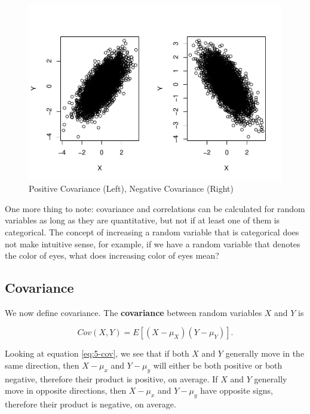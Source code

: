 \documentclass[
]{book}
\begin{document}
\begin{figure}
\centering
\includegraphics{bookdown-demo_files/figure-latex/5-covs-1.pdf}
\caption{\label{fig:5-covs}Positive Covariance (Left), Negative Covariance (Right)}
\end{figure}

One more thing to note: covariance and correlations can be calculated for random variables as long as they are quantitative, but not if at least one of them is categorical. The concept of increasing a random variable that is categorical does not make intuitive sense, for example, if we have a random variable that denotes the color of eyes, what does increasing color of eyes mean?

\hypertarget{covariance}{%
\subsection{Covariance}\label{covariance}}

We now define covariance. The \textbf{covariance} between random variables \(X\) and \(Y\) is

\begin{equation} 
Cov(X,Y) = E\left[(X- \mu_X)(Y - \mu_Y) \right].
\label{eq:5-cov}
\end{equation}

Looking at equation \eqref{eq:5-cov}, we see that if both \(X\) and \(Y\) generally move in the same direction, then \(X - \mu_x\) and \(Y - \mu_y\) will either be both positive or both negative, therefore their product is positive, on average. If \(X\) and \(Y\) generally move in opposite directions, then \(X - \mu_x\) and \(Y - \mu_y\) have opposite signs, therefore their product is negative, on average.
\end{document}
